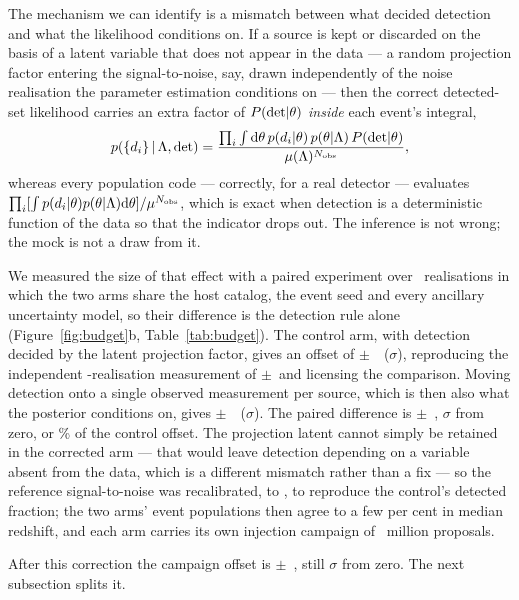 The mechanism we can identify is a mismatch between what decided detection and
what the likelihood conditions on. If a source is kept or discarded on the basis
of a latent variable that does not appear in the data --- a random projection
factor entering the signal-to-noise, say, drawn independently of the noise
realisation the parameter estimation conditions on --- then the correct
detected-set likelihood carries an extra factor of $P({\rm det}|\theta)$
\emph{inside} each event's integral,
\begin{equation}
  p(\{d_i\} \,|\, \Lambda, {\rm det}) =
  \frac{\prod_i \int \mathrm{d}\theta\, p(d_i|\theta)\, p(\theta|\Lambda)\,
        P({\rm det}|\theta)}{\mu(\Lambda)^{N_{\rm obs}}},
  \label{eq:detcoupling}
\end{equation}
whereas every population code --- correctly, for a real detector --- evaluates
$\prod_i [\int p(d_i|\theta) p(\theta|\Lambda) \mathrm{d}\theta] / \mu^{N_{\rm obs}}$, which
is exact when detection is a deterministic function of the data so that the
indicator drops out. The inference is not wrong; the mock is not a draw from it.

We measured the size of that effect with a paired experiment over
\AbCtrlN\ realisations in which the two arms share the host catalog, the event
seed and every ancillary uncertainty model, so their difference is the detection
rule alone (Figure~\ref{fig:budget}b, Table~\ref{tab:budget}). The control arm,
with detection decided by the latent projection factor, gives an offset of
\AbCtrlMean$\pm$\AbCtrlSem~\kmsmpc\ (\AbCtrlSig$\sigma$), reproducing the
independent \CloSeedN-realisation measurement of
\AbBaselineMean$\pm$\AbBaselineSem\ and licensing the comparison. Moving
detection onto a single observed measurement per source, which is then also what
the posterior conditions on, gives \AbObsMean$\pm$\AbObsSem~\kmsmpc\
(\AbObsSig$\sigma$). The paired difference is
\AbDiffMean$\pm$\AbDiffSem~\kmsmpc, \AbDiffSig$\sigma$ from zero, or
\AbFracRemoved\% of the control offset. The projection latent cannot simply be
retained in the corrected arm --- that would leave detection depending on a
variable absent from the data, which is a different mismatch rather than a fix
--- so the reference signal-to-noise was recalibrated, to \AbObsSnrRef, to
reproduce the control's detected fraction; the two arms' event populations then
agree to a few per cent in median redshift, and each arm carries its own
injection campaign of \AbObsInjNdraw\ million proposals.

After this correction the campaign offset is
\CloResidual$\pm$\CloResidualSem~\kmsmpc, still \CloResidualSig$\sigma$ from
zero. The next subsection splits it.

